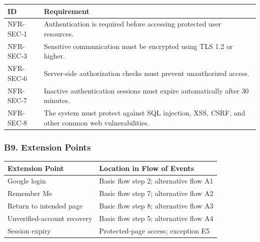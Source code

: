 \documentclass[12pt]{article}
\renewcommand{\baselinestretch}{1.5}
\begin{document}
\begingroup
\small
\renewcommand{\baselinestretch}{1.0}\selectfont
\renewcommand{\arraystretch}{1.15}
\setlength{\tabcolsep}{6pt}
\begin{longtable}{|>{\raggedright\arraybackslash}p{}|>{\raggedright\arraybackslash}p{}|}
\hline
\textbf{ID} & \textbf{Requirement} \\ \hline
\endhead
NFR-SEC-1 & Authentication is required before accessing protected user resources. \\ \hline
NFR-SEC-3 & Sensitive communication must be encrypted using TLS 1.2 or higher. \\ \hline
NFR-SEC-6 & Server-side authorization checks must prevent unauthorized access. \\ \hline
NFR-SEC-7 & Inactive authentication sessions must expire automatically after 30 minutes. \\ \hline
NFR-SEC-8 & The system must protect against SQL injection, XSS, CSRF, and other common web vulnerabilities. \\ \hline
\end{longtable}
\endgroup
\par\medskip

\hypertarget{sec:b9-extension-points}{}
\subsubsection*{B9. Extension Points}
\par\medskip

\begingroup
\small
\renewcommand{\baselinestretch}{1.0}\selectfont
\renewcommand{\arraystretch}{1.15}
\setlength{\tabcolsep}{6pt}
\begin{longtable}{|>{\raggedright\arraybackslash}p{}|>{\raggedright\arraybackslash}p{}|}
\hline
\textbf{Extension Point} & \textbf{Location in Flow of Events} \\ \hline
\endhead
Google login & Basic flow step 2; alternative flow A1 \\ \hline
Remember Me & Basic flow step 7; alternative flow A2 \\ \hline
Return to intended page & Basic flow step 8; alternative flow A3 \\ \hline
Unverified-account recovery & Basic flow step 5; alternative flow A4 \\ \hline
Session expiry & Protected-page access; exception E5 \\ \hline
\end{longtable}
\endgroup
\par\medskip
\end{document}
